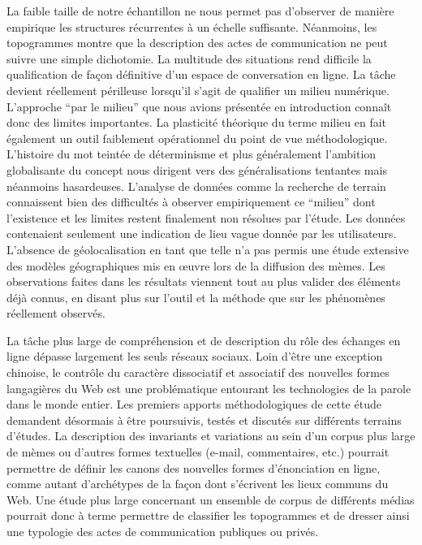 La faible taille de notre échantillon ne nous permet pas d{\textquoteright}observer de manière empirique les structures récurrentes à un échelle suffisante. Néanmoins, les topogrammes montre que la description des actes de communication ne peut suivre une simple dichotomie. La multitude des situations rend difficile la qualification de fa\c{c}on définitive d'un espace de conversation en ligne. La tâche devient réellement périlleuse lorsqu'il s'agit de qualifier un milieu numérique. L'approche ``par le milieu'' que nous avions présentée en introduction connaît donc des limites importantes. La plasticité théorique du terme milieu en fait également un outil faiblement opérationnel du point de vue méthodologique. L'histoire du mot teintée de déterminisme et plus généralement l'ambition globalisante du concept nous dirigent vers des généralisations tentantes mais néanmoins hasardeuses. L'analyse de données comme la recherche de terrain connaissent bien des difficultés à observer empiriquement ce ``milieu'' dont l'existence et les limites restent finalement non résolues par l'étude. Les données contenaient seulement une indication de lieu vague donnée par les utilisateurs. L'absence de géolocalisation en tant que telle n'a pas permis une étude extensive des modèles géographiques mis en œuvre lors de la diffusion des mèmes. Les observations faites dans les résultats viennent tout au plus valider des éléments déjà connus, en disant plus sur l'outil et la méthode que sur les phénomènes réellement observés. 


La t\^ache plus large de compréhension et de description du r\^ole des échanges en ligne dépasse largement les seuls réseaux sociaux. Loin d{\textquoteright}être une exception chinoise, le contr\^ole du caractère dissociatif et associatif des nouvelles formes langagières du Web est une problématique entourant les technologies de la parole dans le monde entier. Les premiers apports méthodologiques de cette étude demandent désormais à être poursuivis, testés et discutés sur différents terrains d{\textquoteright}études. La description des invariants et variations au sein d{\textquoteright}un corpus plus large de mèmes ou d{\textquoteright}autres formes textuelles (e-mail, commentaires, etc.) pourrait permettre de définir les canons des nouvelles formes d{\textquoteright}énonciation en ligne, comme autant d{\textquoteright}archétypes de la fa\c{c}on dont s{\textquoteright}écrivent les lieux communs du Web. Une étude plus large concernant un ensemble de corpus de différents médias pourrait donc à terme permettre de classifier les topogrammes et de dresser ainsi une typologie des actes de communication publiques ou privés. 

